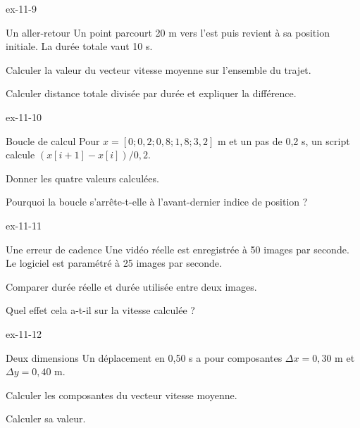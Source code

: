 \clearpage
{}
\begin{blocLivre}{ex-11-9}\begin{exercice}[3]{Un aller-retour}
Un point parcourt 20 m vers l’est puis revient à sa position initiale. La durée totale vaut 10 s.
\begin{questions}
\item Calculer la valeur du vecteur vitesse moyenne sur l’ensemble du trajet.
\item Calculer distance totale divisée par durée et expliquer la différence.
\end{questions}
\end{exercice}\end{blocLivre}
\begin{blocLivre}{ex-11-10}\begin{exercice}[3]{Boucle de calcul}
Pour $x=[0;0,2;0,8;1,8;3,2]$ m et un pas de 0,2 s, un script calcule $(x[i+1]-x[i])/0,2$.
\begin{questions}
\item Donner les quatre valeurs calculées.
\item Pourquoi la boucle s’arrête-t-elle à l’avant-dernier indice de position ?
\end{questions}
\end{exercice}\end{blocLivre}
\begin{blocLivre}{ex-11-11}\begin{exercice}[3]{Une erreur de cadence}
Une vidéo réelle est enregistrée à 50 images par seconde. Le logiciel est paramétré à 25 images par seconde.
\begin{questions}
\item Comparer durée réelle et durée utilisée entre deux images.
\item Quel effet cela a-t-il sur la vitesse calculée ?
\end{questions}
\end{exercice}\end{blocLivre}
\begin{blocLivre}{ex-11-12}\begin{exercice}[3]{Deux dimensions}
Un déplacement en 0,50 s a pour composantes $\Delta x=0,30$ m et $\Delta y=0,40$ m.
\begin{questions}
\item Calculer les composantes du vecteur vitesse moyenne.
\item Calculer sa valeur.
\end{questions}
\end{exercice}\end{blocLivre}

